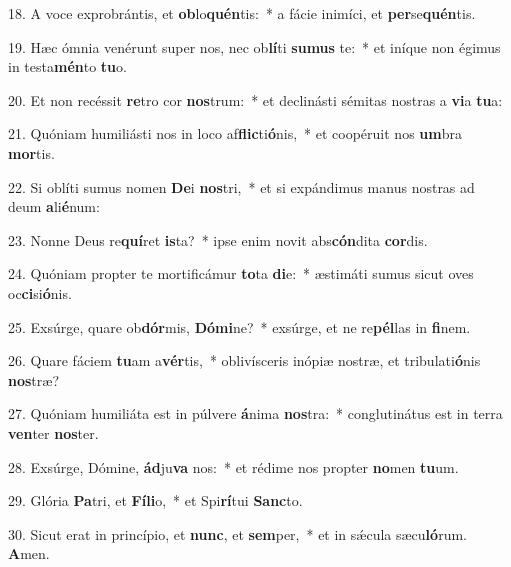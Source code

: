 18. A voce exprobrántis, et \textbf{ob}lo\textbf{quén}tis:~*  a fácie inimíci, et \textbf{per}se\textbf{quén}tis.\

19. Hæc ómnia venérunt super nos, nec ob\textbf{lí}ti \textbf{su}\textbf{mus} te:~*  et iníque non égimus in testa\textbf{mén}to \textbf{tu}o.\

20. Et non recéssit \textbf{re}tro cor \textbf{nos}trum:~*  et declinásti sémitas nostras a \textbf{vi}a \textbf{tu}a:\

21. Quóniam humiliásti nos in loco af\textbf{flic}ti\textbf{ó}nis,~*  et coopéruit nos \textbf{um}bra \textbf{mor}tis.\

22. Si oblíti sumus nomen \textbf{De}i \textbf{nos}tri,~*  et si expándimus manus nostras ad deum \textbf{a}li\textbf{é}num:\

23. Nonne Deus re\textbf{quí}ret \textbf{is}ta?~*  ipse enim novit abs\textbf{cón}dita \textbf{cor}dis.\

24. Quóniam propter te mortificámur \textbf{to}ta \textbf{di}e:~*  æstimáti sumus sicut oves oc\textbf{ci}si\textbf{ó}nis.\

25. Exsúrge, quare ob\textbf{dór}mis, \textbf{Dó}\textbf{mi}ne?~*  exsúrge, et ne re\textbf{pél}las in \textbf{fi}nem.\

26. Quare fáciem \textbf{tu}am a\textbf{vér}tis,~*  oblivísceris inópiæ nostræ, et tribulati\textbf{ó}nis \textbf{nos}træ?\

27. Quóniam humiliáta est in púlvere \textbf{á}nima \textbf{nos}tra:~*  conglutinátus est in terra \textbf{ven}ter \textbf{nos}ter.\

28. Exsúrge, Dómine, \textbf{ád}ju\textbf{va} nos:~*  et rédime nos propter \textbf{no}men \textbf{tu}um.\

29. Glória \textbf{Pa}tri, et \textbf{Fí}\textbf{li}o,~*  et Spi\textbf{rí}tui \textbf{Sanc}to.\

30. Sicut erat in princípio, et \textbf{nunc}, et \textbf{sem}per,~*  et in sǽcula sæcu\textbf{ló}rum. \textbf{A}men.\

